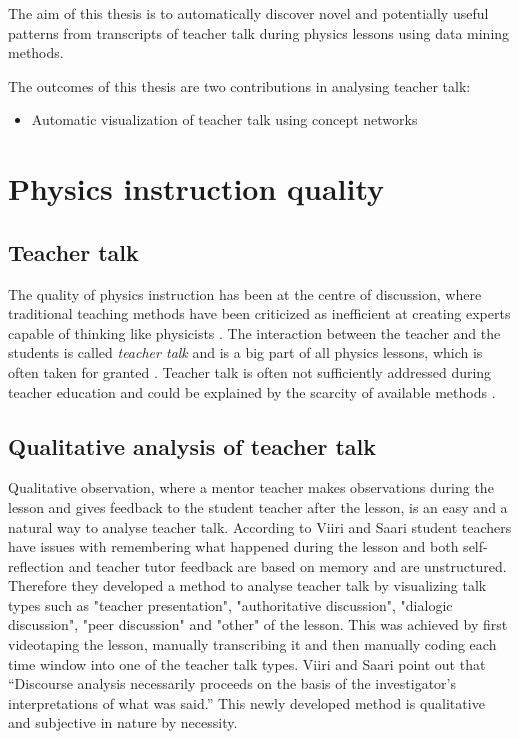 \documentclass[utf8,english]{gradu3}
\begin{document}
The aim of this thesis is to automatically discover novel and potentially useful patterns from transcripts of teacher talk during physics lessons using data mining methods. 

The outcomes of this thesis are two contributions in analysing teacher talk:

\begin{itemize}
  \item Automatic visualization of teacher talk using concept networks
\end{itemize}



\chapter{Physics instruction quality}
\label{chap:quip}


\section{Teacher talk}
The quality of physics instruction has been at the centre of discussion, where traditional teaching methods have been criticized as inefficient at creating experts capable of thinking like physicists \parencite{wiemanTransformingPhysicsEducation2007}. The interaction between the teacher and the students is called \emph{teacher talk} and is a big part of all physics lessons, which is often taken for granted \parencite{scottTeachingScienceMeaningful2007}. Teacher talk is often not sufficiently addressed during teacher education and could be explained by the scarcity of available methods \parencite{lehesvuoriDialogicTeachingScience2013,viiriTeacherTalkPatterns2006, crespoPraisingCorrectingProspective2002}.

\section{Qualitative analysis of teacher talk}
Qualitative observation, where a mentor teacher makes observations during the lesson and gives feedback to the student teacher after the lesson, is an easy and a natural way to analyse teacher talk. According to Viiri and Saari \parencite*{viiriTeacherTalkPatterns2006} student teachers have issues with remembering what happened during the lesson and both self-reflection and teacher tutor feedback are based on memory and are unstructured. Therefore they developed a method to analyse teacher talk by visualizing talk types such as "teacher presentation", "authoritative discussion", "dialogic discussion", "peer discussion" and "other" of the lesson. This was achieved by first videotaping the lesson, manually transcribing it and then manually coding each time window into one of the teacher talk types. Viiri and Saari \parencite*{viiriTeacherTalkPatterns2006} point out that \enquote{Discourse analysis necessarily proceeds on the basis of the investigator’s interpretations of what was said.} This newly developed method is qualitative and subjective in nature by necessity.
\end{document}

